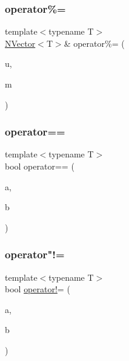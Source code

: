 \subsubsection{\texorpdfstring{operator\%=}{operator\%=}}
{\footnotesize\ttfamily template$<$typename T$>$ \\
\mbox{\hyperlink{class_n_vector}{N\+Vector}}$<$T$>$\& operator\%= (\begin{DoxyParamCaption}\item[{\mbox{\hyperlink{class_n_vector}{N\+Vector}}$<$ T $>$ \&}]{u,  }\item[{const \mbox{\hyperlink{class_n_p_matrix}{N\+P\+Matrix}}$<$ T $>$ \&}]{m }\end{DoxyParamCaption})\hspace{0.3cm}{\ttfamily [friend]}}

\mbox{\label{class_n_p_matrix_a8b906fe5547a2234430316ccfed4b98a}} 
\subsubsection{\texorpdfstring{operator==}{operator==}}
{\footnotesize\ttfamily template$<$typename T$>$ \\
bool operator== (\begin{DoxyParamCaption}\item[{const \mbox{\hyperlink{class_n_p_matrix}{N\+P\+Matrix}}$<$ T $>$ \&}]{a,  }\item[{const \mbox{\hyperlink{class_n_p_matrix}{N\+P\+Matrix}}$<$ T $>$ \&}]{b }\end{DoxyParamCaption})\hspace{0.3cm}{\ttfamily [friend]}}

\mbox{\label{class_n_p_matrix_a04301fcca6baa720c7a10c61bdee2645}} 
\subsubsection{\texorpdfstring{operator"!=}{operator!=}}
{\footnotesize\ttfamily template$<$typename T$>$ \\
bool \mbox{\hyperlink{class_n_p_matrix_a0f6cfdff016d49df6c2dbb79e85b9842}{operator!}}= (\begin{DoxyParamCaption}\item[{const \mbox{\hyperlink{class_n_p_matrix}{N\+P\+Matrix}}$<$ T $>$ \&}]{a,  }\item[{const \mbox{\hyperlink{class_n_p_matrix}{N\+P\+Matrix}}$<$ T $>$ \&}]{b }\end{DoxyParamCaption})\hspace{0.3cm}{\ttfamily [friend]}}



